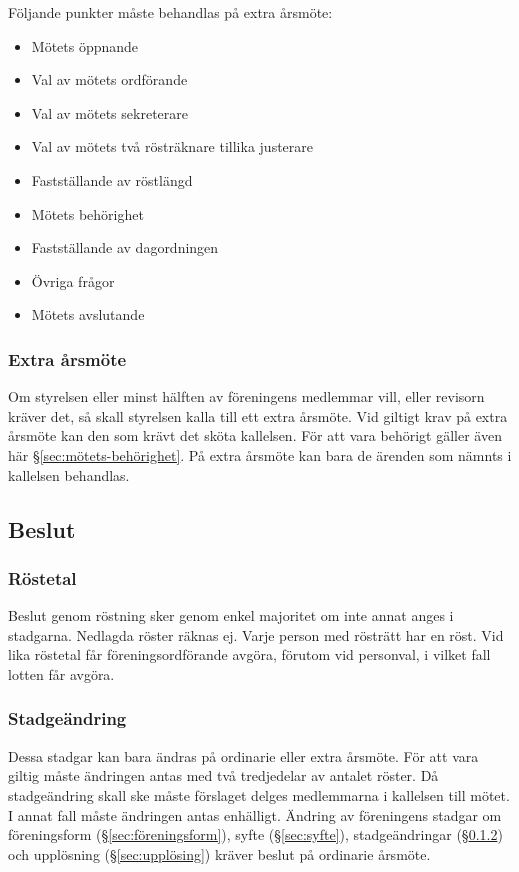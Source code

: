 Följande punkter måste behandlas på extra årsmöte:
\begin{itemize}
    \item Mötets öppnande
    \item Val av mötets ordförande
    \item Val av mötets sekreterare
    \item Val av mötets två rösträknare tillika justerare
    \item Fastställande av röstlängd
    \item Mötets behörighet
    \item Fastställande av dagordningen
    \item Övriga frågor
    \item Mötets avslutande
\end{itemize}

\subsubsection{Extra årsmöte}
Om styrelsen eller minst hälften av föreningens medlemmar vill, eller revisorn kräver det, så skall styrelsen kalla till ett extra årsmöte. Vid giltigt krav på extra årsmöte kan den som krävt det sköta kallelsen. För att vara behörigt gäller även här §\ref{sec:mötets-behörighet}. På extra årsmöte kan bara de ärenden som nämnts i kallelsen behandlas.

\subsection{Beslut}

\subsubsection{Röstetal}
Beslut genom röstning sker genom enkel majoritet om inte annat anges i stadgarna. Nedlagda röster räknas ej. Varje person med rösträtt har en röst. Vid lika röstetal får föreningsordförande avgöra, förutom vid personval, i vilket fall lotten får avgöra.

\subsubsection{Stadgeändring} \label{sec:stadgeändringar}
Dessa stadgar kan bara ändras på ordinarie eller extra årsmöte. För att vara giltig måste ändringen antas med två tredjedelar av antalet röster. Då stadgeändring skall ske måste förslaget delges medlemmarna i kallelsen till mötet. I annat fall måste ändringen antas enhälligt. Ändring av föreningens stadgar om föreningsform (§\ref{sec:föreningsform}), syfte (§\ref{sec:syfte}), stadgeändringar (§\ref{sec:stadgeändringar}) och upplösning (§\ref{sec:upplösing}) kräver beslut på ordinarie årsmöte.

